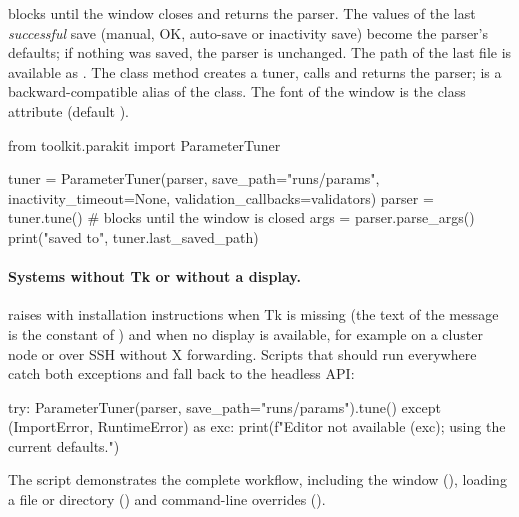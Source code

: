 blocks until the window closes and returns the parser. The
values of the last \emph{successful} save (manual, OK, auto-save or
inactivity save) become the parser's defaults; if nothing was saved, the
parser is unchanged. The path of the last file is available as
. The class method
 creates a tuner, calls
 and returns the parser;  is a
backward-compatible alias of the class. The font of the window is the class
attribute  (default ).

\begin{pycode}
from toolkit.parakit import ParameterTuner

tuner = ParameterTuner(parser, save_path="runs/params", inactivity_timeout=None,
                       validation_callbacks=validators)
parser = tuner.tune()                  # blocks until the window is closed
args = parser.parse_args()
print("saved to", tuner.last_saved_path)
\end{pycode}

\paragraph{Systems without Tk or without a display.}
 raises  with installation instructions when
Tk is missing (the text of the message is the constant
 of ) and 
when no display is available, for example on a cluster node or over SSH without X
forwarding. Scripts that should run everywhere catch both exceptions and fall
back to the headless API:

\begin{pycode}
try:
    ParameterTuner(parser, save_path="runs/params").tune()
except (ImportError, RuntimeError) as exc:
    print(f"Editor not available ({exc}); using the current defaults.")
\end{pycode}

The script  demonstrates the complete
workflow, including the window (), loading a file or directory
() and command-line overrides ().

\par\endgroup
